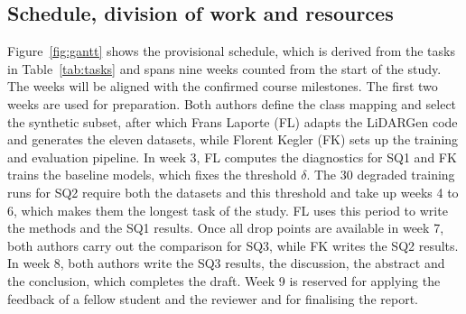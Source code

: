 \subsection{Schedule, division of work and resources}\label{sec:schedule}
Figure~\ref{fig:gantt} shows the provisional schedule, which is derived from the tasks in Table~\ref{tab:tasks} and spans nine weeks counted from the start of the study. The weeks will be aligned with the confirmed course milestones. The first two weeks are used for preparation. Both authors define the class mapping and select the synthetic subset, after which Frans Laporte (FL) adapts the LiDARGen code and generates the eleven datasets, while Florent Kegler (FK) sets up the training and evaluation pipeline. In week 3, FL computes the diagnostics for SQ1 and FK trains the baseline models, which fixes the threshold $\delta$. The 30 degraded training runs for SQ2 require both the datasets and this threshold and take up weeks 4 to 6, which makes them the longest task of the study. FL uses this period to write the methods and the SQ1 results. Once all drop points are available in week 7, both authors carry out the comparison for SQ3, while FK writes the SQ2 results. In week 8, both authors write the SQ3 results, the discussion, the abstract and the conclusion, which completes the draft. Week 9 is reserved for applying the feedback of a fellow student and the reviewer and for finalising the report.

